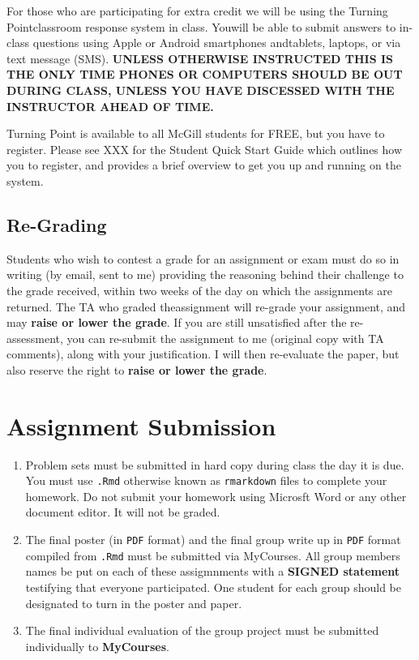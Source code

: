\documentclass[11pt,]{article}
\begin{document}
For those who are participating for extra credit we will be using the
Turning Pointclassroom response system in class. Youwill be able to
submit answers to in-class questions using Apple or Android smartphones
andtablets, laptops, or via text message (SMS). \textbf{UNLESS OTHERWISE
INSTRUCTED THIS IS THE ONLY TIME PHONES OR COMPUTERS SHOULD BE OUT
DURING CLASS, UNLESS YOU HAVE DISCESSED WITH THE INSTRUCTOR AHEAD OF
TIME.}

Turning Point is available to all McGill students for FREE, but you have
to register. Please see XXX for the Student Quick Start Guide which
outlines how you to register, and provides a brief overview to get you
up and running on the system.

\subsection{Re-Grading}\label{re-grading}

Students who wish to contest a grade for an assignment or exam must do
so in writing (by email, sent to me) providing the reasoning behind
their challenge to the grade received, within two weeks of the day on
which the assignments are returned. The TA who graded theassignment will
re-grade your assignment, and may \textbf{raise or lower the grade}. If
you are still unsatisfied after the re-assessment, you can re-submit the
assignment to me (original copy with TA comments), along with your
justification. I will then re-evaluate the paper, but also reserve the
right to \textbf{raise or lower the grade}.

\section{Assignment Submission}\label{assignment-submission}

\begin{enumerate}
\def\labelenumi{\arabic{enumi}.}
\item
  Problem sets must be submitted in hard copy during class the day it is
  due. You must use \texttt{.Rmd} otherwise known as \texttt{rmarkdown}
  files to complete your homework. Do not submit your homework using
  Microsft Word or any other document editor. It will not be graded.
\item
  The final poster (in \texttt{PDF} format) and the final group write up
  in \texttt{PDF} format compiled from \texttt{.Rmd} must be submitted
  via MyCourses. All group members names be put on each of these
  assigmnments with a \textbf{SIGNED statement} testifying that everyone
  participated. One student for each group should be designated to turn
  in the poster and paper.
\item
  The final individual evaluation of the group project must be submitted
  individually to \textbf{MyCourses}.
\end{enumerate}
\end{document}
